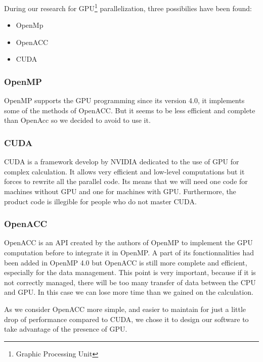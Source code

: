 During our research for GPU\footnote{Graphic Processing Unit} parallelization, three possibilies have been found:
\begin{itemize}
\item OpenMp
\item OpenACC
\item CUDA
\end{itemize}


\subsubsection{OpenMP}
OpenMP supports the GPU programming since its version 4.0, it implements some of the methods of OpenACC. But it seems to be less efficient and complete than OpenAcc so we decided to avoid to use it.

\subsubsection{CUDA}
CUDA is a framework develop by NVIDIA dedicated to the use of GPU for complex calculation. It allows very efficient and low-level computations but it forces to rewrite all the parallel code. Its means that we will need one code for machines without GPU and one for machines with GPU. Furthermore, the product code is illegible for people who do not master CUDA.

\subsubsection{OpenACC}
OpenACC is an API created by the authors of OpenMP to implement the GPU computation before to integrate it in OpenMP. A part of its fonctionnalities had been added in OpenMP 4.0 but OpenACC is still more complete and efficient, especially for the data management. This point is very important, because if it is not correctly managed, there will be too many transfer of data between the CPU and GPU. In this case we can lose more time than we gained on the calculation. 

As we consider OpenACC more simple, and easier to maintain for just a little drop of performance compared to CUDA, we chose it to design our software to take advantage of the presence of GPU.